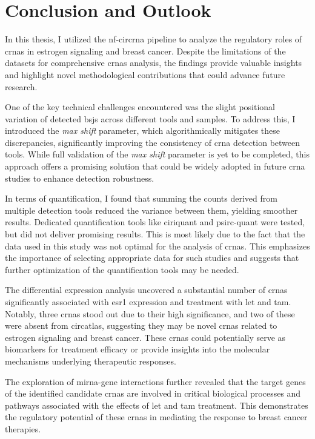 \chapter{Conclusion and Outlook}
\label{sec:conclusion_and_outlook}

In this thesis, I utilized the \gls{nf-circrna} pipeline to analyze the
regulatory roles of \glspl{crna} in estrogen signaling and breast cancer.
Despite the limitations of the datasets for comprehensive \glspl{crna}
analysis, the findings provide valuable insights and highlight novel
methodological contributions that could advance future research.

One of the key technical challenges encountered was the slight positional
variation of detected \glspl{bsj} across different tools and samples.
To address this, I introduced the \textit{max shift} parameter, which
algorithmically mitigates these discrepancies, significantly improving the
consistency of \gls{crna} detection between tools.
While full validation of the \textit{max shift} parameter is yet to be
completed, this approach offers a promising solution that could be widely
adopted in future \gls{crna} studies to enhance detection robustness.

In terms of quantification, I found that summing the counts derived from
multiple detection tools reduced the variance between them, yielding smoother
results.
Dedicated quantification tools like \gls{ciriquant} and \gls{psirc-quant} were
tested, but did not deliver promising results.
This is most likely due to the fact that the data used in this study was not
optimal for the analysis of \glspl{crna}.
This emphasizes the importance of selecting appropriate data for such studies
and suggests that further optimization of the quantification tools may be
needed.

The differential expression analysis uncovered a substantial number of
\glspl{crna} significantly associated with \gls{esr1} expression and treatment
with \gls{let} and \gls{tam}.
Notably, three \glspl{crna} stood out due to their high significance, and two
of these were absent from \gls{circatlas}, suggesting they may be novel
\glspl{crna} related to estrogen signaling and breast cancer.
These \glspl{crna} could potentially serve as biomarkers for treatment efficacy
or provide insights into the molecular mechanisms underlying therapeutic
responses.

The exploration of \gls{mirna}-gene interactions further revealed that the
target genes of the identified candidate \glspl{crna} are involved in critical
biological processes and pathways associated with the effects of \gls{let} and
\gls{tam} treatment.
This demonstrates the regulatory potential of these \glspl{crna} in mediating
the response to breast cancer therapies.

